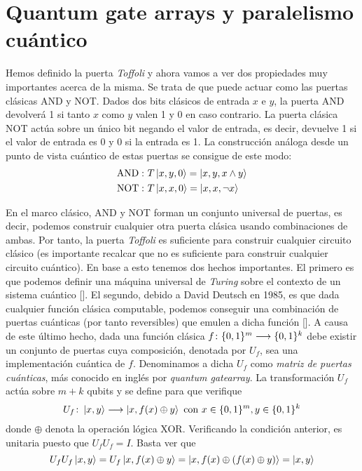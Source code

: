 \section{Quantum gate arrays y paralelismo cuántico}\label{sec:sec49}
Hemos definido la puerta \textit{Toffoli} y ahora vamos a ver dos propiedades muy importantes acerca de la misma. Se trata de que puede actuar como las puertas clásicas AND y NOT. Dados dos bits clásicos de entrada $x$ e $y$, la puerta AND devolverá 1 si tanto $x$ como $y$ valen 1 y 0 en caso contrario. La puerta clásica NOT actúa sobre un único bit negando el valor de entrada, es decir, devuelve 1 si el valor de entrada es 0 y 0 si la entrada es 1. La construcción análoga desde un punto de vista cuántico de estas puertas se consigue de este modo:
\[
\begin{split}
\mathrm{AND:\ }&T\left|x,y,0\right\rangle=\left|x,y,x\wedge y\right\rangle\\
\mathrm{NOT:\ }&T\left|x,x,0\right\rangle=\left|x,x,\neg x\right\rangle
\end{split}
\]

En el marco clásico, AND y NOT forman un conjunto universal de puertas, es decir, podemos construir cualquier otra puerta clásica usando combinaciones de ambas. Por tanto, la puerta \textit{Toffoli} es suficiente para construir cualquier circuito clásico (es importante recalcar que no es suficiente para construir cualquier circuito cuántico). En base a esto tenemos dos hechos importantes. El primero es que podemos definir una máquina universal de \textit{Turing} sobre el contexto de un sistema cuántico [\cite{bernstein1997quantum}]. El segundo, debido a David Deutsch en 1985, es que dada cualquier función clásica computable, podemos conseguir una combinación de puertas cuánticas (por tanto reversibles) que emulen a dicha función [\cite{deutsch1985quantum}]. A causa de este último hecho, dada una función clásica $f\colon \{0,1\}^m\longrightarrow \{0,1\}^k$ debe existir un conjunto de puertas cuya composición, denotada por $U_f$, sea una implementación cuántica de $f$. Denominamos a dicha $U_f$ como \textit{matriz de puertas cuánticas}, más conocido en inglés por \textit{quantum gatearray}. La transformación $U_f$ actúa sobre $m+k$ qubits y se define para que verifique
\[U_f\colon \left|x,y\right\rangle\longrightarrow \left|x,f(x)\oplus y\right\rangle\mathrm{\ con\ }x\in\{0,1\}^m,y\in\{0,1\}^k\]
%
donde $\oplus$ denota la operación lógica XOR. Verificando la condición anterior, es unitaria puesto que $U_fU_f=I$. Basta ver que
\[U_fU_f\left|x,y\right\rangle=U_f\left|x,f(x)\oplus y\right\rangle=\left|x,f(x)\oplus(f(x)\oplus y)\right\rangle=\left|x,y\right\rangle
\]

